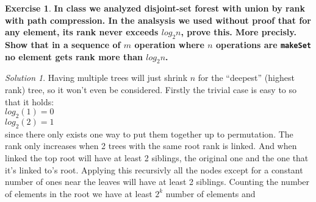 \documentclass[a4paper,twoside=false,abstract=false,numbers=noenddot,
titlepage=false,headings=small,parskip=half,version=last]{scrartcl}
\theoremstyle{definition}
\newtheorem{exercise}{Exercise}
\theoremstyle{remark}
\newtheorem*{solution}{Solution}
\begin{document}
\begin{exercise}
{\bf
In class we analyzed disjoint-set forest with union by rank with path compression.
In the analsysis we used without proof that for any element, its rank never
exceeds $log_2n$, prove this. More precisly.
Show that in a sequence of $m$ operation where $n$ operations are
\verb+makeSet+ no element gets rank more than $log_2n$.
}
\end{exercise}
\begin{solution}
Having multiple trees will just shrink $n$ for the ``deepest'' (highest rank) tree, so it won't even
be considered.
Firstly the trivial case is easy to so that it holds: \\
$log_2(1)=0$\\
$log_2(2)=1$\\
since there only exists one way to put them together up to permutation.
The rank only increases when 2 trees with the same root rank is linked.
And when linked the top root will have at least 2 siblings, the original one
and the one that it's linked to's root.
Applying this recursivly all the nodes except for a constant number of ones
near the leaves will have at least 2 siblings.
Counting the number of elements in the root we have at least $2^k$ number of
elements and










\end{solution}
\end{document}
